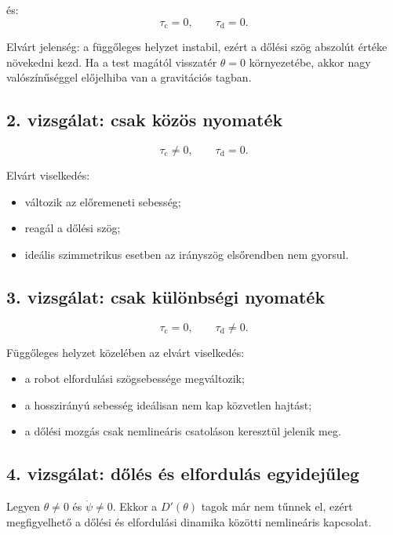 \documentclass[12pt,a4paper]{article}
\newcommand{\tauc}{\tau_{\mathrm{c}}}
\newcommand{\taud}{\tau_{\mathrm{d}}}
\begin{document}
	és:
	\begin{equation}
		\tauc=0,\qquad \taud=0.
	\end{equation}
	
	Elvárt jelenség: a függőleges helyzet instabil, ezért a dőlési szög abszolút értéke növekedni kezd. Ha a test magától visszatér $\theta=0$ környezetébe, akkor nagy valószínűséggel előjelhiba van a gravitációs tagban.
	
	\subsection{2. vizsgálat: csak közös nyomaték}
	
	\begin{equation}
		\tauc\neq0,\qquad \taud=0.
	\end{equation}
	
	Elvárt viselkedés:
	\begin{itemize}[leftmargin=2em]
		\item változik az előremeneti sebesség;
		\item reagál a dőlési szög;
		\item ideális szimmetrikus esetben az irányszög elsőrendben nem gyorsul.
	\end{itemize}
	
	\subsection{3. vizsgálat: csak különbségi nyomaték}
	
	\begin{equation}
		\tauc=0,\qquad \taud\neq0.
	\end{equation}
	
	Függőleges helyzet közelében az elvárt viselkedés:
	\begin{itemize}[leftmargin=2em]
		\item a robot elfordulási szögsebessége megváltozik;
		\item a hosszirányú sebesség ideálisan nem kap közvetlen hajtást;
		\item a dőlési mozgás csak nemlineáris csatoláson keresztül jelenik meg.
	\end{itemize}
	
	\subsection{4. vizsgálat: dőlés és elfordulás egyidejűleg}
	
	Legyen $\theta\neq0$ és $\dot\psi\neq0$. Ekkor a $D'(\theta)$ tagok már nem tűnnek el, ezért megfigyelhető a dőlési és elfordulási dinamika közötti nemlineáris kapcsolat.
	
\end{document}
